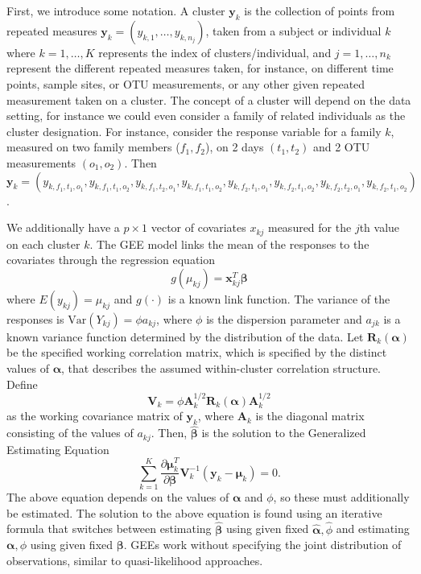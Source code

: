 \documentclass[12pt]{article}
\begin{document}
First, we introduce some notation. A cluster $\mathbf{y}_k$ is the collection of points from repeated measures $\mathbf{y}_k = (y_{k,1}, \ldots , y_{k,n_j})$, taken from a subject or individual $k$ where $k = 1, \ldots , K$ represents the index of clusters/individual, and $j = 1, \ldots , n_k$ represent the different repeated measures taken, for instance, on different  time points, sample sites, or OTU measurements, or any other given repeated measurement taken on a cluster.
The concept of a cluster will depend on the data setting, for instance we could even consider a family of related individuals as the cluster designation. For instance, consider the response variable for a family $k$, measured on two family members ($f_1,f_2$), on 2 days $(t_1,t_2)$ and 2 OTU measurements $(o_1,o_2)$. Then $\mathbf{y}_k = (y_{k, f_1,t_1,o_1}, y_{k, f_1,t_1,o_2}, y_{k, f_1,t_2,o_1}, y_{k, f_1,t_1,o_2},y_{k, f_2,t_1,o_1}, y_{k, f_2,t_1,o_2}, y_{k, f_2,t_2,o_1}, y_{k, f_2,t_1,o_2})$.


We additionally have a $p \times 1$ vector of covariates $x_{kj}$ measured for the $j$th value on each cluster $k$. The GEE model links the mean of the responses to the covariates through the regression equation
$$g(\mu_{kj}) = \mathbf{x}_{kj}^T\boldsymbol \beta$$
where $E(y_{kj}) = \mu_{kj}$ and $g(\cdot)$ is a known link function. The variance of the responses is $\text{Var}(Y_{kj}) = \phi a_{kj}$, where $\phi$ is the dispersion parameter and $a_{jk}$ is a known variance function determined by the distribution of the data. Let $\mathbf{R}_k(\boldsymbol\alpha)$ be the specified working correlation matrix, which is specified by the distinct values of $\boldsymbol\alpha$, that describes the assumed within-cluster correlation structure. Define
$$\mathbf{V}_k = \phi \mathbf{A}_k^{1/2} \mathbf{R}_{k}(\boldsymbol\alpha)\mathbf{A}_k^{1/2}$$ as the working covariance matrix of $\mathbf{y}_k$, where $\mathbf{A}_k$ is the diagonal matrix consisting of the values of $a_{kj}$. Then, $\hat{\boldsymbol\beta}$ is the solution to the Generalized Estimating Equation
$$\sum_{k=1}^K \frac{\partial  \boldsymbol\mu_k^T }{\partial \boldsymbol\beta } \mathbf{V}_{k}^{-1} (\mathbf{y}_k - \boldsymbol{\mu}_k) = 0. $$
The above equation depends on the values of $\boldsymbol\alpha$ and $\phi$, so these must additionally be estimated. The solution to the above equation is found using an iterative formula that switches between estimating $\hat{\boldsymbol\beta}$ using given fixed $\hat{\boldsymbol\alpha}, \hat \phi$ and estimating $\boldsymbol\alpha,  \phi$ using given fixed $\boldsymbol\beta$. GEEs work without specifying the joint distribution of observations, similar to quasi-likelihood approaches.
\end{document}
